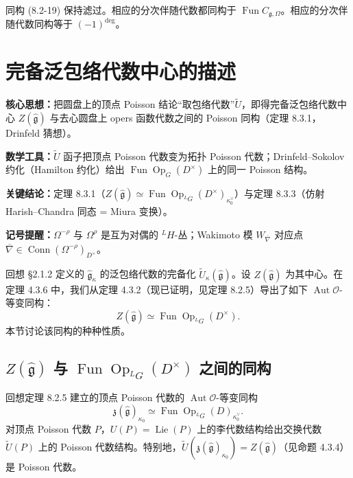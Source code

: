 \begin{theorem}
    同构 (8.2-19) 保持滤过。相应的分次伴随代数都同构于 $\operatorname{Fun}C_{\mathfrak g,\Omega}$。相应的分次伴随代数同构等于 $(-1)^{\deg}$。
\end{theorem}

\section{完备泛包络代数中心的描述}

\begin{keypoints}
    \item \textbf{核心思想：}把圆盘上的顶点 Poisson 结论“取包络代数”$\widetilde U$，即得完备泛包络代数中心 $Z(\hat{\mathfrak g})$ 与去心圆盘上 opers 函数代数之间的 Poisson 同构（定理 8.3.1，Drinfeld 猜想）。
    \item \textbf{数学工具：}$\widetilde U$ 函子把顶点 Poisson 代数变为拓扑 Poisson 代数；Drinfeld–Sokolov 约化（Hamilton 约化）给出 $\operatorname{Fun}\operatorname{Op}_G(D^\times)$ 上的同一 Poisson 结构。
    \item \textbf{关键结论：}定理 8.3.1（$Z(\hat{\mathfrak g})\simeq\operatorname{Fun}\operatorname{Op}_{{}^LG}(D^\times)_{\kappa^\vee_0}$）与定理 8.3.3（仿射 Harish--Chandra 同态 = Miura 变换）。
    \item \textbf{记号提醒：}$\Omega^{-\rho}$ 与 $\Omega^{\rho}$ 是互为对偶的 ${}^LH$-丛；Wakimoto 模 $W_{\overline\nabla}$ 对应点 $\overline\nabla\in\operatorname{Conn}(\Omega^{-\rho})_{D^\times}$。
\end{keypoints}

回想 §2.1.2 定义的 $\hat{\mathfrak g}_\kappa$ 的泛包络代数的完备化 $\widetilde U_\kappa(\hat{\mathfrak g})$。设 $Z(\hat{\mathfrak g})$ 为其中心。在定理 4.3.6 中，我们从定理 4.3.2（现已证明，见定理 8.2.5）导出了如下 $\operatorname{Aut}\mathcal O$-等变同构：
\begin{equation}
    Z(\hat{\mathfrak g})\simeq\operatorname{Fun}\operatorname{Op}_{{}^LG}(D^\times).
    \tag{8.3-1}
\end{equation}
本节讨论该同构的种种性质。

\subsection{$Z(\hat{\mathfrak g})$ 与 $\operatorname{Fun}\operatorname{Op}_{{}^LG}(D^\times)$ 之间的同构}

回想定理 8.2.5 建立的顶点 Poisson 代数的 $\operatorname{Aut}\mathcal O$-等变同构
\begin{equation}
    \mathfrak z(\hat{\mathfrak g})_{\kappa_0}\simeq\operatorname{Fun}\operatorname{Op}_{{}^LG}(D)_{\kappa^\vee_0}.
    \tag{8.3-2}
\end{equation}
对顶点 Poisson 代数 $P$，$U(P)=\operatorname{Lie}(P)$ 上的李代数结构给出交换代数 $\widetilde U(P)$ 上的 Poisson 代数结构。特别地，$\widetilde U(\mathfrak z(\hat{\mathfrak g})_{\kappa_0})=Z(\hat{\mathfrak g})$（见命题 4.3.4）是 Poisson 代数。

